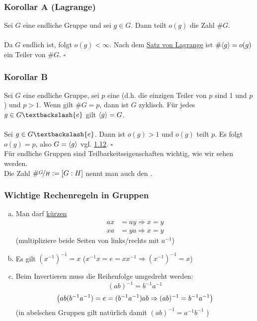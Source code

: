 \subsubsection*{Korollar A (Lagrange)}
Sei $G$ eine endliche Gruppe und sei $g\in G$. Dann teilt $o(g)$ die Zahl $\#G$.\\

\\
Da $G$ endlich ist, folgt $o(g)<\infty$. Nach dem \hyperref[sub:satz_von_lagrange]{Satz von Lagrange} ist $\#\langle g \rangle=o(g)$ ein Teiler von $\#G$.
\hfill $\square$

\subsubsection*{Korollar B}
Sei $G$ eine endliche Gruppe, sei $p$ eine   (d.h. die einzigen Teiler von $p$ sind 1 und $p$) und $p>1$. 
Wenn gilt $\#G=p$, dann ist $G$ zyklisch. 
Für jedes $g\in G \textbackslash\{e\}$ gilt $\langle g \rangle=G$.\\

\\
Sei $g \in G\textbackslash\{e\}$.
 Dann ist $o(g)>1$ und $o(g)$ teilt $p$. 
 Es folgt $o(g)=p$, also $G=\langle g \rangle$ vgl. \hyperref[sub:zyklische_gruppen]{1.12}.
\hfill $\square$\\

Für endliche Gruppen sind Teilbarkeitseigenschaften wichtig, wie wir sehen werden.\\
Die Zahl $\#\nicefrac{G}{H}:=[G:H]$ nennt man auch den .

\subsubsection*{Wichtige Rechenregeln in Gruppen}
\begin{enumerate}[(a)]
	\item Man darf \uline{kürzen}
	\begin{equation*}
	\begin{aligned}
		ax &= ay \Rightarrow x=y\\
		xa &= ya \Rightarrow x=y
	\end{aligned}
	\end{equation*}
	(multipliziere beide Seiten von links/rechts mit $a^{-1}$)
	\item Es gilt $(x^{-1})^{-1}=x$   ($x^{-1}x=e=xx^{-1} \Rightarrow (x^{-1})^{-1}=x$)
	\item Beim Invertieren muss die Reihenfolge umgedreht werden:\\
	\[
	(ab)^{-1}=b^{-1}a^{-1}
	\]
	\[
	\left( ab(b^{-1}a^{-1})=e=(b^{-1}a^{-1})ab \Rightarrow (ab)^{-1}=b^{-1}a^{-1}\right)
	\]
	(in abelschen Gruppen gilt natürlich damit $(ab)^{-1}=a^{-1}b^{-1}$ )
\end{enumerate}
